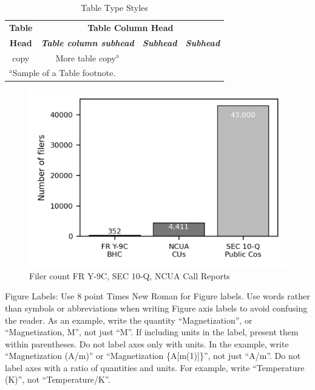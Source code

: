 \documentclass[conference]{IEEEtran}
\begin{document}
\begin{table}[htbp]
\caption{Table Type Styles}
\begin{center}
\begin{tabular}{|c|c|c|c|}
\hline
\textbf{Table}&\multicolumn{3}{|c|}{\textbf{Table Column Head}} \\
\cline{2-4} 
\textbf{Head} & \textbf{\textit{Table column subhead}}& \textbf{\textit{Subhead}}& \textbf{\textit{Subhead}} \\
\hline
copy& More table copy$^{\mathrm{a}}$& &  \\
\hline
\multicolumn{4}{l}{$^{\mathrm{a}}$Sample of a Table footnote.}
\end{tabular}
\label{tab1}
\end{center}
\end{table}

\begin{figure}[htbp]
\centerline{\includegraphics{9C Vs 10-Q Vs NCUA Grayscale.png}}
\caption{Filer count FR Y-9C, SEC 10-Q, NCUA Call Reports}
\label{fig}
\end{figure}

Figure Labels: Use 8 point Times New Roman for Figure labels. Use words 
rather than symbols or abbreviations when writing Figure axis labels to 
avoid confusing the reader. As an example, write the quantity 
``Magnetization'', or ``Magnetization, M'', not just ``M''. If including 
units in the label, present them within parentheses. Do not label axes only 
with units. In the example, write ``Magnetization (A/m)'' or ``Magnetization 
\{A[m(1)]\}'', not just ``A/m''. Do not label axes with a ratio of 
quantities and units. For example, write ``Temperature (K)'', not 
``Temperature/K''.
\end{document}
